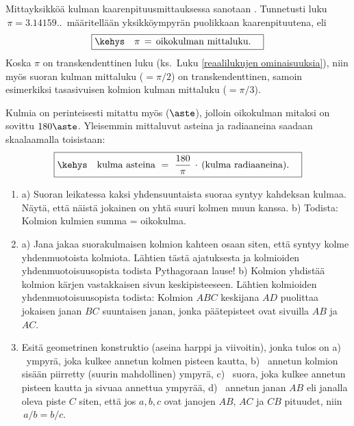 Mittayksikköä kulman kaarenpituusmittauksessa sanotaan . Tunnetusti
luku $\,\pi=3.14159..\,$ määritellään yksikköympyrän puolikkaan kaarenpituutena, eli
\[
\boxed{\kehys\quad \pi \,=\, \text{oikokulman mittaluku}. \quad}
\]
Koska $\pi$ on transkendenttinen luku (ks.\ Luku \ref{reaalilukujen ominaisuuksia}), niin
myös suoran kulman mittaluku ($=\pi/2$) on transkendenttinen, samoin esimerkiksi
tasasivuisen kolmion kulman mittaluku ($=\pi/3$).

Kulmia on perinteisesti mitattu myös  ($\aste$), jolloin oikokulman mitaksi
on sovittu $180\aste$. Yleisemmin mittaluvut asteina ja radiaaneina saadaan skaalaamalla
toisistaan:
\[
\boxed{\kehys\quad \text{kulma asteina}\ 
               =\ \frac{180}{\pi}\,\cdot\,\text{(kulma radiaaneina)}. \quad}
\]

\Harj
\begin{enumerate}

\item \label{H-II-1: kulmat}
a) Suoran leikatessa kaksi yhdensuuntaista suoraa syntyy kahdeksan kulmaa. Näytä, että
näistä jokainen on yhtä suuri kolmen muun kanssa. \newline
b) Todista: Kolmion kulmien summa = oikokulma.

\item \label{H-II-1: yhdenmuotoisuus} 
a) Jana jakaa suorakulmaisen kolmion kahteen osaan siten, että syntyy kolme yhdenmuotoista 
kolmiota. Lähtien tästä ajatuksesta ja kolmioiden yhdenmuotoisuusopista todista Pythagoraan 
lause! \newline
b) Kolmion  yhdistää kolmion kärjen vastakkaisen sivun keskipisteeseen.
Lähtien kolmioiden yhdenmuotoisuusopista todista: Kolmion $ABC$ keskijana $AD$ puolittaa
jokaisen janan $BC$ suuntaisen janan, jonka päätepisteet ovat sivuilla $AB$ ja $AC$.

\item {}
Esitä geometrinen konstruktio (aseina harppi ja viivoitin), jonka tulos on \newline
a) \ ympyrä, joka kulkee annetun kolmen pisteen kautta, \newline
b) \ annetun kolmion sisään piirretty (suurin mahdollinen) ympyrä, \newline
c) \ suora, joka kulkee annetun pisteen kautta ja sivuaa annettua ympyrää,
d) \ annetun janan $AB$ \kor{kultainen leikkaus} eli janalla oleva piste $C$ siten, että
jos $a,b,c$ ovat janojen $AB$, $AC$ ja $CB$ pituudet, niin $\,a/b=b/c$.


\end{enumerate}
